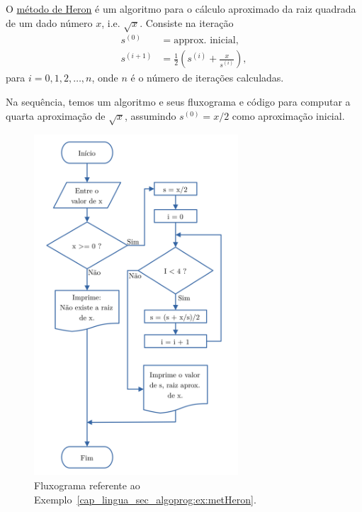 \begin{ex}\label{cap_lingua_sec_algoprog:ex:metHeron}
  O \href{https://en.wikipedia.org/wiki/Methods_of_computing_square_roots#Heron's_method}{método de Heron}{\heron} é um algoritmo para o cálculo aproximado da raiz quadrada de um dado número $x$, i.e. $\sqrt{x}$. Consiste na iteração
  \begin{align}
    s^{(0)} &= \text{approx. inicial},\\
    s^{(i+1)} &= \frac{1}{2}\left(s^{(i)} + \frac{x}{s^{(i)}}\right),
  \end{align}
  para $i=0,1,2,\ldots,n$, onde $n$ é o número de iterações calculadas.

  Na sequência, temos um algoritmo e seus fluxograma e código {\python} para computar a quarta aproximação de $\sqrt{x}$, assumindo $s^{(0)} = x/2$ como aproximação inicial.

  \begin{figure}[ht]
    \centering
    \includegraphics[height=5in]{./cap_lingua/dados/fig_fluxograma/fig.png}
    \caption{Fluxograma referente ao Exemplo~\ref{cap_lingua_sec_algoprog:ex:metHeron}.}
    \label{cap_lingua_sec_algoprog:fig:metHeron}
  \end{figure}


\end{ex}
